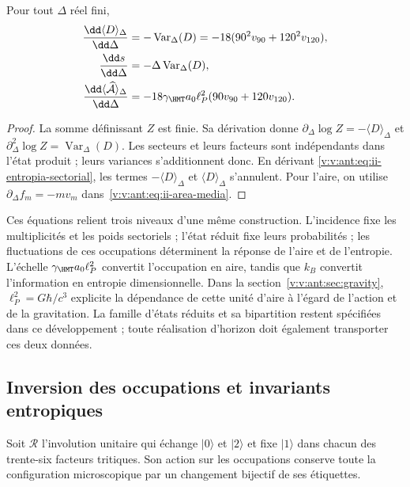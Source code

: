 \begin{proposition}
Pour tout $\Delta$ réel fini,
\begin{align}
 \frac{\dd\langle D\rangle_\Delta}{\dd\Delta}
 &=-\operatorname{Var}_\Delta(D)
   =-18(90^2v_{90}+120^2v_{120}),\\
 \frac{\dd s}{\dd\Delta}
 &=-\Delta\operatorname{Var}_\Delta(D),
 \label{v:v:ant:eq:ii-respuesta-entropica}\\
 \frac{\dd\langle\widehat{\mathcal A}\rangle_\Delta}{\dd\Delta}
 &=-18\gamma_{\HMT}a_0\ell_P^2(90v_{90}+120v_{120}).
 \label{v:v:ant:eq:ii-respuesta-areal}
\end{align}
\end{proposition}
\begin{proof}
La somme définissant $Z$ est finie. Sa dérivation donne
$\partial_\Delta\log Z=-\langle D\rangle_\Delta$ et
$\partial_\Delta^2\log Z=\operatorname{Var}_\Delta(D)$.
Les secteurs et leurs facteurs sont indépendants dans l'état produit ;
leurs variances s'additionnent donc. En dérivant
\eqref{v:v:ant:eq:ii-entropia-sectorial}, les termes
$-\langle D\rangle_\Delta$ et $\langle D\rangle_\Delta$
s'annulent. Pour l'aire, on utilise
$\partial_\Delta f_m=-mv_m$ dans~\eqref{v:v:ant:eq:ii-area-media}.
\end{proof}

Ces équations relient trois niveaux d’une même construction.
L’incidence fixe les multiplicités et les poids sectoriels ;
l’état réduit fixe leurs probabilités ; les fluctuations de ces
occupations déterminent la réponse de l’aire et de l’entropie.
L’échelle $\gamma_{\HMT}a_0\ell_P^2$ convertit l’occupation en aire,
tandis que $k_B$ convertit l’information en entropie dimensionnelle.
Dans la section~\ref{v:v:ant:sec:gravity}, $\ell_P^2=G\hbar/c^3$ explicite
la dépendance de cette unité d’aire à l’égard de l’action et de la gravitation.
La famille d’états réduits et sa bipartition restent spécifiées
dans ce développement ; toute réalisation d’horizon doit également transporter
ces deux données.

\subsection{Inversion des occupations et invariants entropiques}
\label{v:v:ant:sec:ii-inversion-sectorial}

Soit $\mathcal R$ l'involution unitaire qui échange $|0\rangle$
et $|2\rangle$ et fixe $|1\rangle$ dans chacun des trente-six
facteurs tritiques. Son action sur les occupations conserve toute la
configuration microscopique par un changement bijectif de ses étiquettes.

